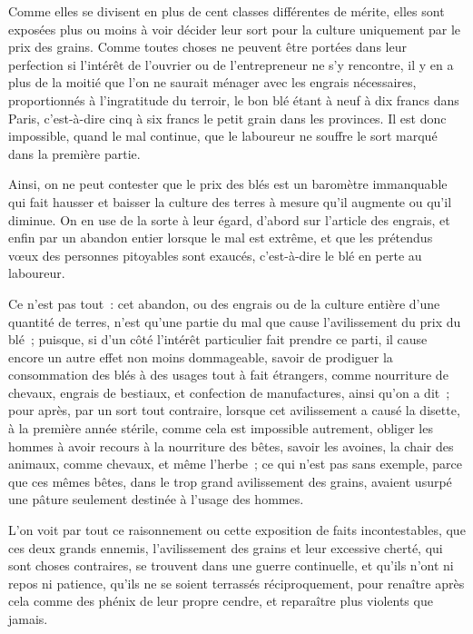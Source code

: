 \documentclass[french,twoside]{book} %
\begin{document}
Comme elles se divisent en plus de cent classes différentes de mérite, elles sont exposées plus ou moins à voir décider leur sort pour la culture uniquement par le prix des grains. Comme toutes choses ne peuvent être portées dans leur perfection si l’intérêt de l’ouvrier ou de l’entrepreneur ne s’y rencontre, il y en a plus de la moitié que l’on ne saurait ménager avec les engrais nécessaires, proportionnés à l’ingratitude du terroir, le bon blé étant à neuf à dix francs dans Paris, c’est-à-dire cinq à six francs le petit grain dans les provinces. Il est donc impossible, quand le mal continue, que le laboureur ne souffre le sort marqué dans la première partie.\par
Ainsi, on ne peut contester que le prix des blés est un baromètre immanquable qui fait hausser et baisser la culture des terres à mesure qu’il augmente ou qu’il diminue. On en use de la sorte à leur égard, d’abord sur l’article des engrais, et enfin par un abandon entier lorsque le mal est extrême, et que les prétendus vœux des personnes pitoyables sont exaucés, c’est-à-dire le blé en perte au laboureur.\par
Ce n’est pas tout : cet abandon, ou des engrais ou de la culture entière d’une quantité de terres, n’est qu’une partie du mal que cause l’avilissement du prix du blé ; puisque, si d’un côté l’intérêt particulier fait prendre ce parti, il cause encore un autre effet non moins dommageable, savoir de prodiguer la consommation des blés à des usages tout à fait étrangers, comme nourriture de chevaux, engrais de bestiaux, et confection de manufactures, ainsi qu’on a dit ; pour après, par un sort tout contraire, lorsque cet avilissement a causé la disette, à la première année stérile, comme cela est impossible autrement, obliger les hommes à avoir recours à la nourriture des bêtes, savoir les avoines, la chair des animaux, comme chevaux, et même l’herbe ; ce qui n’est pas sans exemple, parce que ces mêmes bêtes, dans le trop grand avilissement des grains, avaient usurpé une pâture seulement destinée à l’usage des hommes.\par
L’on voit par tout ce raisonnement ou cette exposition de faits incontestables, que ces deux grands ennemis, l’avilissement des grains et leur excessive cherté, qui sont choses contraires, se trouvent dans une guerre continuelle, et qu’ils n’ont ni repos ni patience, qu’ils ne se soient terrassés réciproquement, pour renaître après cela comme des phénix de leur propre cendre, et reparaître plus violents que jamais.\par
\end{document}
